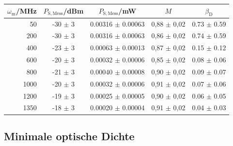 \begin{center}
    \captionsetup{type=table}
    \begin{tabular}{r | c c | c c}
        $\omega_\mathrm{m}$/MHz & $P_\mathrm{S,Mess}$/dBm & $P_\mathrm{S,Mess}$/mW & $M$ & $\beta_\mathrm{D}$\\ \hline
        50   & -30 $\pm$ 3 & 0.00316 $\pm$ 0.00063 & 0,88 $\pm$ 0,02 & 0.73 $\pm$ 0.59 \\
        200  & -30 $\pm$ 3 & 0.00316 $\pm$ 0.00063 & 0,86 $\pm$ 0,02 & 0.74 $\pm$ 0.59 \\
        400  & -23 $\pm$ 3 & 0.00063 $\pm$ 0.00013 & 0,87 $\pm$ 0,02 & 0.15 $\pm$ 0.12 \\
        600  & -20 $\pm$ 3 & 0.00032 $\pm$ 0.00006 & 0,85 $\pm$ 0,02 & 0.08 $\pm$ 0.06 \\
        800  & -21 $\pm$ 3 & 0.00040 $\pm$ 0.00008 & 0,90 $\pm$ 0,02 & 0.09 $\pm$ 0.07 \\
        1000 & -20 $\pm$ 3 & 0.00032 $\pm$ 0.00006 & 0,91 $\pm$ 0,02 & 0.07 $\pm$ 0.06 \\
        1200 & -19 $\pm$ 3 & 0.00025 $\pm$ 0.00005 & 0,90 $\pm$ 0,02 & 0.06 $\pm$ 0.05 \\
        1350 & -18 $\pm$ 3 & 0.00020 $\pm$ 0.00004 & 0,91 $\pm$ 0,02 & 0.04 $\pm$ 0.03 \\
    \end{tabular}
    \label{tab:ausbeute}
\end{center}

\subsection{Minimale optische Dichte}
\label{sub:minopDichte}







